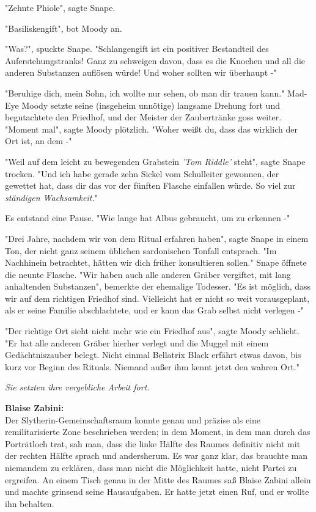 {"Zehnte Phiole", sagte Snape.

"Basiliskengift", bot Moody an.

"Was?", spuckte Snape. "Schlangengift ist ein positiver Bestandteil des Auferstehungstranks! Ganz zu schweigen davon, dass es die Knochen und all die anderen Substanzen auflösen würde! Und woher sollten wir überhaupt -"

"Beruhige dich, mein Sohn, ich wollte nur sehen, ob man dir trauen kann." Mad-Eye Moody setzte seine (insgeheim unnötige) langsame Drehung fort und begutachtete den Friedhof, und der Meister der Zaubertränke goss weiter. "Moment mal", sagte Moody plötzlich. "Woher weißt du, dass das wirklich der Ort ist, an dem -"

"Weil auf dem leicht zu bewegenden Grabstein \emph{'Tom Riddle'} steht", sagte Snape trocken. "Und ich habe gerade zehn Sickel vom Schulleiter gewonnen, der gewettet hat, dass dir das vor der fünften Flasche einfallen würde. So viel zur \emph{ständigen Wachsamkeit.}"

Es entstand eine Pause. "Wie lange hat Albus gebraucht, um zu erkennen -"

"Drei Jahre, nachdem wir von dem Ritual erfahren haben", sagte Snape in einem Ton, der nicht ganz seinem üblichen sardonischen Tonfall entsprach. "Im Nachhinein betrachtet, hätten wir dich früher konsultieren sollen." Snape öffnete die neunte Flasche. "Wir haben auch alle anderen Gräber vergiftet, mit lang anhaltenden Substanzen", bemerkte der ehemalige Todesser. "Es ist möglich, dass wir auf dem richtigen Friedhof sind. Vielleicht hat er nicht so weit vorausgeplant, als er seine Familie abschlachtete, und er kann das Grab selbst nicht verlegen -"

"Der richtige Ort sieht nicht mehr wie ein Friedhof aus", sagte Moody schlicht. "Er hat alle anderen Gräber hierher verlegt und die Muggel mit einem Gedächtniszauber belegt. Nicht einmal Bellatrix Black erfährt etwas davon, bis kurz vor Beginn des Rituals. Niemand außer ihm kennt jetzt den wahren Ort."

\emph{Sie setzten ihre vergebliche Arbeit fort.}

\textbf{Blaise Zabini:}\\ Der Slytherin-Gemeinschaftsraum konnte genau und präzise als eine remilitarisierte Zone beschrieben werden; in dem Moment, in dem man durch das Porträtloch trat, sah man, dass die linke Hälfte des Raumes definitiv nicht mit der rechten Hälfte sprach und andersherum. Es war ganz klar, das brauchte man niemandem zu erklären, dass man nicht die Möglichkeit hatte, nicht Partei zu ergreifen. An einem Tisch genau in der Mitte des Raumes saß Blaise Zabini allein und machte grinsend seine Hausaufgaben. Er hatte jetzt einen Ruf, und er wollte ihn behalten.

}
